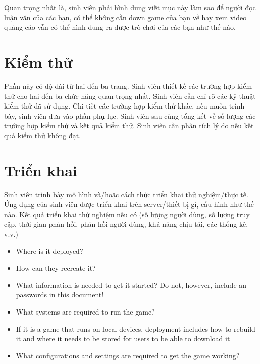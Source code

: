 \documentclass[../DoAn.tex]{subfiles}
\begin{document}
Quan trọng nhất là, sinh viên phải hình dung viết mục này làm sao để người đọc luận văn của các bạn, có thể không cần down game của bạn về hay xem video quảng cáo vẫn có thể hình dung ra được trò chơi của các bạn như thế nào.

\section{Kiểm thử}
Phần này có độ dài từ hai đến ba trang. Sinh viên thiết kế các trường hợp kiểm thử cho hai đến ba chức năng quan trọng nhất. Sinh viên cần chỉ rõ các kỹ thuật kiểm thử đã sử dụng. Chi tiết các trường hợp kiểm thử khác, nếu muốn trình bày, sinh viên đưa vào phần phụ lục.
Sinh viên sau cùng tổng kết về số lượng các trường hợp kiểm thử và kết quả kiểm thử. Sinh viên cần phân tích lý do nếu kết quả kiểm thử không đạt.

\section{Triển khai}
Sinh viên trình bày mô hình và/hoặc cách thức triển khai thử nghiệm/thực tế. Ứng dụng của sinh viên được triển khai trên server/thiết bị gì, cấu hình như thế nào. Kết quả triển khai thử nghiệm nếu có (số lượng người dùng, số lượng truy cập, thời gian phản hồi, phản hồi người dùng, khả năng chịu tải, các thống kê, v.v.)

\begin{itemize}
    \item Where is it deployed? 
    \item How can they recreate it? 
    \item What information is needed to get it started? Do not, however, include an passwords in this document!
    \item What systems are required to run the game? 
    \item If it is a game that runs on local devices, deployment includes how to rebuild it and where it needs to be stored for users to be able to download it
    \item What configurations and settings are required to get the game working?
\end{itemize}
\end{document}
